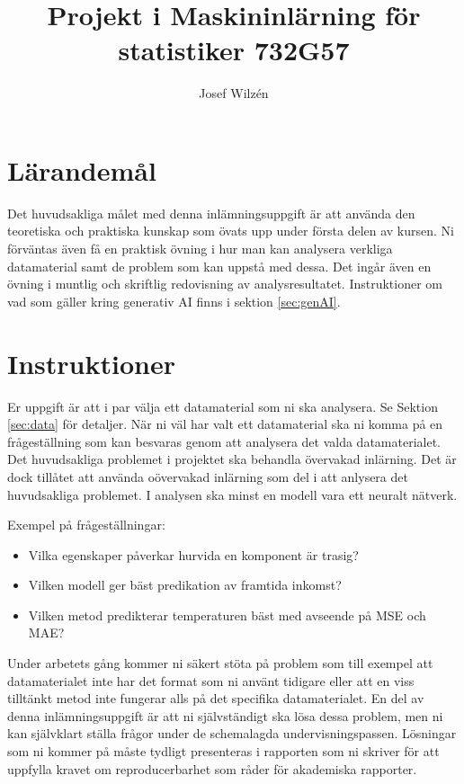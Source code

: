 \documentclass[a4paper]{article}
\title{Projekt i Maskininlärning för statistiker 732G57}
\author{Josef Wilzén}
\begin{document}
\maketitle
\thispagestyle{fancy}


\section{Lärandemål}

Det huvudsakliga målet med denna inlämningsuppgift är att använda den teoretiska och 
praktiska kunskap som övats upp under första delen av kursen. Ni förväntas även få 
en praktisk övning i hur man kan analysera verkliga datamaterial samt de problem som 
kan uppstå med dessa. Det ingår även en övning i muntlig och skriftlig redovisning 
av analysresultatet. Instruktioner om vad som gäller kring generativ AI finns i sektion \ref{sec:genAI}.

\section{Instruktioner}

Er uppgift är att i par välja ett datamaterial som ni ska analysera. Se Sektion \ref{sec:data} för detaljer. När ni väl har valt ett datamaterial ska ni komma på en frågeställning som kan besvaras genom att analysera det valda datamaterialet. Det huvudsakliga problemet i projektet ska behandla övervakad inlärning. Det är dock tillåtet att använda oövervakad inlärning som del i att anlysera det huvudsakliga problemet. I analysen ska minst en modell vara ett neuralt nätverk.

Exempel på frågeställningar:
\begin{itemize}
    \item Vilka egenskaper påverkar hurvida en komponent är trasig? 
    \item Vilken modell ger bäst predikation av framtida inkomst?
    \item Vilken metod predikterar temperaturen bäst med avseende på MSE och MAE?
\end{itemize}
Under arbetets gång kommer ni säkert stöta på problem som till exempel att datamaterialet inte har det format som ni använt tidigare eller att en viss tilltänkt metod inte fungerar alls på det specifika datamaterialet. En del av denna inlämningsuppgift är att ni självständigt ska lösa dessa problem, men ni kan självklart ställa frågor under de schemalagda undervisningspassen. Lösningar som ni kommer på måste tydligt presenteras i rapporten som ni skriver för att uppfylla kravet om reproducerbarhet som råder för akademiska rapporter.
\end{document}
